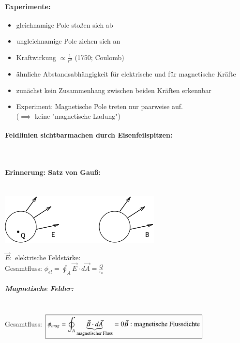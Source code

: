 \paragraph{Experimente:}
\begin{itemize}
  \item gleichnamige Pole stoßen sich ab
  \item ungleichnamige Pole ziehen sich an\\
  \item Kraftwirkung $\propto\frac{1}{r^2}$ (1750; Coulomb)
  \item ähnliche Abstandsabhängigkeit für elektrische und für magnetische Kräfte
  \item zunächst kein Zusammenhang zwischen beiden Kräften erkennbar
  \item Experiment: Magnetische Pole treten nur paarweise auf. \\ ($\implies$ keine "magnetische Ladung")
\end{itemize}

\paragraph{Feldlinien sichtbarmachen durch Eisenfeilspitzen:}\leavevmode \\


\paragraph{Erinnerung: Satz von Gauß:}\leavevmode \\
\includegraphics{skizzen/16/16_0B01}

$\vec{E}:$ elektrische Feldstärke:\\
Gesamtfluss: $\phi_{el}=\oint_A \vec{E}\cdot d\vec{A}=\frac{Q}{\epsilon_0}$\\

\subparagraph{Magnetische Felder:}\leavevmode \\

Gesamtfluss: $\boxed{ \phi_{mag}=\oint_A \underbrace{\vec{B}\cdot d\vec{A}}_{\text{magnetischer Fluss}}=0 \\ \vec{B}: \text{magnetische Flussdichte}}$
  
